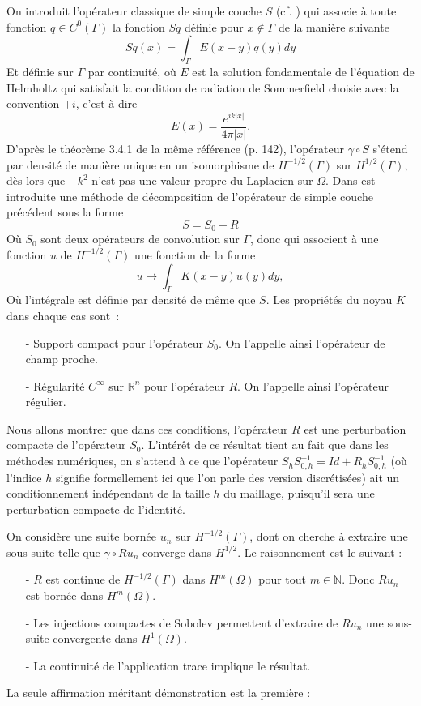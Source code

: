 \documentclass[11pt,a4paper]{article}
\begin{document}
On introduit l'opérateur classique de simple couche $S$ (cf. \cite[Chapitre 3, page 113]{nedelec2001acoustic}) qui associe à toute fonction $q \in C^0(\Gamma)$ la fonction $Sq$ définie pour $x \notin \Gamma$ de la manière suivante 
\[ Sq(x) = \int_{\Gamma} E(x-y)q(y) dy \]
Et définie sur $\Gamma$ par continuité, où $E$ est la solution fondamentale de l'équation de Helmholtz qui satisfait la condition de radiation de Sommerfield choisie avec la convention $+i$, c'est-à-dire 
\[ E(x) = \dfrac{e^{ik|x|}}{4\pi|x|}.\]
D'après le théorème 3.4.1 de la même référence (p. 142), l'opérateur $\gamma \circ S$ s'étend par densité de manière unique en un isomorphisme de $H^{-1/2}(\Gamma)$ sur $H^{1/2}(\Gamma)$, dès lors que $-k^2$ n'est pas une valeur propre du Laplacien sur $\Omega$. 
Dans \cite{alouges2015sparse} est introduite une méthode de décomposition de l'opérateur de simple couche précédent sous la forme 
\[ S = S_0 + R\]
Où $S_0$ sont deux opérateurs de convolution sur $\Gamma$, donc qui associent à une fonction $u$ de $H^{-1/2}(\Gamma)$ une fonction de la forme
\[ u \mapsto \int_{\Gamma} K(x-y)u(y)dy,\]
Où l'intégrale est définie par densité de même que $S$. Les propriétés du noyau $K$ dans chaque cas sont~: 
\begin{itemize}
\item[-] Support compact pour l'opérateur $S_0$. On l'appelle ainsi l'opérateur de champ proche. 
\item[-] Régularité $C^{\infty}$ sur $\mathbb{R}^n$ pour l'opérateur $R$. On l'appelle ainsi l'opérateur régulier.  
\end{itemize}
Nous allons montrer que dans ces conditions, l'opérateur $R$ est une perturbation compacte de l'opérateur $S_0$. L'intérêt de ce résultat tient au fait que dans les méthodes numériques, on s'attend à ce que l'opérateur  $S_h S_{0,h}^{-1} = Id + R_h S_{0,h}^{-1}$ (où l'indice $h$ signifie formellement ici que l'on parle des version discrétisées) ait un conditionnement indépendant de la taille $h$ du maillage, puisqu'il sera une perturbation compacte de l'identité.  

On considère une suite bornée $u_n$ sur $H^{-1/2}(\Gamma)$, dont on cherche à extraire une sous-suite telle que $\gamma \circ R u_n$ converge dans $H^{1/2}$. Le raisonnement est le suivant : 
\begin{itemize}
\item[-] $R$ est continue de $H^{-1/2}(\Gamma)$ dans $H^m(\Omega)$ pour tout $m\in \mathbb{N}$. Donc $Ru_n$ est bornée dans $H^m(\Omega)$.  
\item[-] Les injections compactes de Sobolev permettent d'extraire de $Ru_n$ une sous-suite convergente dans $H^{1}(\Omega)$. 
\item[-] La continuité de l'application trace implique le résultat. 
\end{itemize} 
La seule affirmation méritant démonstration est la première :
\end{document}
